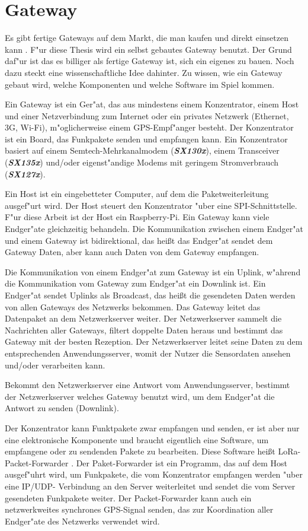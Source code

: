 \section{Gateway}\label{Gateway}

Es gibt fertige Gateways auf dem Markt, die man kaufen und direkt
einsetzen kann . F"ur diese Thesis wird ein selbst gebautes Gateway
benutzt. Der Grund daf"ur ist das es billiger als fertige Gateway ist,
sich ein eigenes zu bauen. Noch dazu steckt eine wissenschaftliche Idee
dahinter. Zu wissen, wie ein Gateway gebaut wird, welche Komponenten
und welche Software im Spiel kommen.  

Ein Gateway ist ein Ger"at, das aus mindestens einem Konzentrator, einem
Host und einer Netzverbindung zum Internet oder ein privates Netzwerk
(Ethernet, 3G, Wi-Fi), m"oglicherweise einem GPS-Empf"anger besteht. Der
Konzentrator ist ein Board, das Funkpakete senden und empfangen kann.
Ein Konzentrator basiert auf einem Semtech-Mehrkanalmodem
(\textbf{\textit{SX130x}}), einem Transceiver (\textbf{\textit{SX135x}})
und/oder eigenst"andige Modems mit geringem Stromverbrauch
(\textbf{\textit{SX127x}}).  

Ein Host ist ein eingebetteter Computer, auf dem die Paketweiterleitung
ausgef"urt wird. Der Host steuert den Konzentrator "uber eine
SPI-Schnittstelle. F"ur diese Arbeit ist der Host ein Raspberry-Pi. Ein
Gateway kann viele Endger"ate gleichzeitig behandeln. Die Kommunikation
zwischen einem Endger"at und einem Gateway ist bidirektional, das hei\ss{}t
das Endger"at sendet dem Gateway Daten, aber kann auch Daten von dem
Gateway empfangen.

Die Kommunikation von einem Endger"at zum Gateway ist ein Uplink,
w"ahrend die Kommunikation vom Gateway zum Endger"at ein Downlink ist.
Ein Endger"at sendet Uplinks als Broadcast, das hei\ss{}t die gesendeten
Daten werden von allen Gateways des Netzwerks bekommen. Das Gateway
leitet das Datenpaket an dem Netzwerkserver weiter. Der Netzwerkserver
sammelt die Nachrichten aller Gateways, filtert doppelte Daten heraus
und bestimmt das Gateway mit der besten Rezeption. Der Netzwerkserver
leitet seine Daten zu dem entsprechenden Anwendungsserver, womit der
Nutzer die Sensordaten ansehen und/oder verarbeiten kann.

Bekommt den Netzwerkserver eine Antwort vom Anwendungsserver, bestimmt
der Netzwerkserver welches Gateway benutzt wird, um dem Endger"at die
Antwort zu senden (Downlink).

Der Konzentrator kann Funktpakete zwar empfangen und senden, er ist
aber nur eine elektronische Komponente und braucht eigentlich eine
Software, um empfangene oder zu sendenden Pakete zu bearbeiten. Diese 
Software hei\ss{}t LoRa-Packet-Forwarder \cite{paketForwarder}. 
Der Paket-Forwarder ist ein Programm, das auf dem Host ausgef"uhrt wird,
um Funkpakete, die vom Konzentrator empfangen werden "uber eine IP/UDP-
Verbindung an den Server weiterleitet und sendet die vom Server gesendeten 
Funkpakete weiter. Der Packet-Forwarder kann auch ein netzwerkweites
synchrones GPS-Signal senden, das zur Koordination aller Endger"ate des
Netzwerks verwendet wird. 



